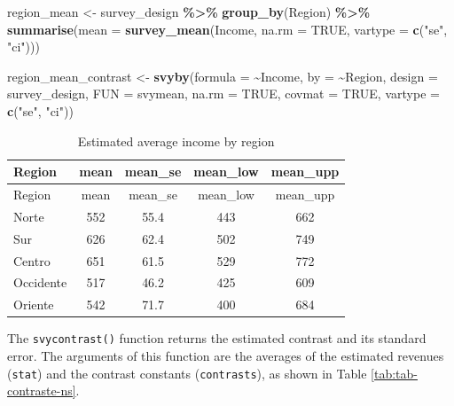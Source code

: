 \documentclass[
  english,
  12pt,
]{book}
\newenvironment{Shaded}{\begin{snugshade}}{\end{snugshade}}
\newcommand{\AttributeTok}[1]{\textcolor[rgb]{0.13,0.29,0.53}{#1}}
\newcommand{\ConstantTok}[1]{\textcolor[rgb]{0.56,0.35,0.01}{#1}}
\newcommand{\FunctionTok}[1]{\textcolor[rgb]{0.13,0.29,0.53}{\textbf{#1}}}
\newcommand{\NormalTok}[1]{#1}
\newcommand{\OtherTok}[1]{\textcolor[rgb]{0.56,0.35,0.01}{#1}}
\newcommand{\SpecialCharTok}[1]{\textcolor[rgb]{0.81,0.36,0.00}{\textbf{#1}}}
\newcommand{\StringTok}[1]{\textcolor[rgb]{0.31,0.60,0.02}{#1}}
\begin{document}
\begin{Shaded}
\begin{Highlighting}[]
\NormalTok{region\_mean }\OtherTok{\textless{}{-}}\NormalTok{ survey\_design }\SpecialCharTok{\%\textgreater{}\%}
  \FunctionTok{group\_by}\NormalTok{(Region) }\SpecialCharTok{\%\textgreater{}\%}
  \FunctionTok{summarise}\NormalTok{(}\AttributeTok{mean =} \FunctionTok{survey\_mean}\NormalTok{(Income,}
                               \AttributeTok{na.rm =} \ConstantTok{TRUE}\NormalTok{,}
                               \AttributeTok{vartype =} \FunctionTok{c}\NormalTok{(}\StringTok{"se"}\NormalTok{, }\StringTok{"ci"}\NormalTok{)))}

\NormalTok{region\_mean\_contrast }\OtherTok{\textless{}{-}} \FunctionTok{svyby}\NormalTok{(}\AttributeTok{formula =} \SpecialCharTok{\textasciitilde{}}\NormalTok{Income,}
                              \AttributeTok{by =} \SpecialCharTok{\textasciitilde{}}\NormalTok{Region,}
                              \AttributeTok{design =}\NormalTok{ survey\_design,}
                              \AttributeTok{FUN =}\NormalTok{ svymean,}
                              \AttributeTok{na.rm =} \ConstantTok{TRUE}\NormalTok{,}
                              \AttributeTok{covmat =} \ConstantTok{TRUE}\NormalTok{,}
                              \AttributeTok{vartype =} \FunctionTok{c}\NormalTok{(}\StringTok{"se"}\NormalTok{, }\StringTok{"ci"}\NormalTok{))}
\end{Highlighting}
\end{Shaded}

\begin{longtable}[]{@{}lcccc@{}}
\caption{\label{tab:tab-prom-region}Estimated average income by region}\tabularnewline
\toprule\noalign{}
Region & mean & mean\_se & mean\_low & mean\_upp \\
\midrule\noalign{}
\endfirsthead
\toprule\noalign{}
Region & mean & mean\_se & mean\_low & mean\_upp \\
\midrule\noalign{}
\endhead
\bottomrule\noalign{}
\endlastfoot
Norte & 552 & 55.4 & 443 & 662 \\
Sur & 626 & 62.4 & 502 & 749 \\
Centro & 651 & 61.5 & 529 & 772 \\
Occidente & 517 & 46.2 & 425 & 609 \\
Oriente & 542 & 71.7 & 400 & 684 \\
\end{longtable}

The \texttt{svycontrast()} function returns the estimated contrast and its standard error. The arguments of this function are the averages of the estimated revenues (\texttt{stat}) and the contrast constants (\texttt{contrasts}), as shown in Table \ref{tab:tab-contraste-ns}.
\end{document}
